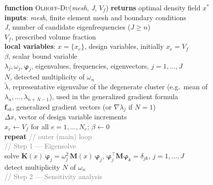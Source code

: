 \documentclass[12pt,a4paper]{article}
\newcommand{\kw}[1]{\textbf{#1}}          %
\newcommand{\fn}[1]{\textsc{#1}}          %
\newcommand{\var}[1]{\textit{#1}}         %
\newcommand{\cm}[1]{\textcolor{gray}{#1}} %
\newcommand{\ind}{\hspace*{1.4em}}        %
\newcommand{\assign}{\ensuremath{\leftarrow}}%
\begin{document}
\medskip
\begin{algobox}
\kw{function} \fn{Olhoff-Du}(\var{mesh}, \var{J}, \var{$V_f$})
\kw{returns} optimal density field $x^*$\\[2pt]
\ind\kw{inputs}: \var{mesh}, finite element mesh and boundary conditions\\
\ind\hspace*{4.2em}\var{J}, number of candidate eigenfrequencies ($J \geq n$)\\
\ind\hspace*{4.2em}$V_f$, prescribed volume fraction\\[2pt]
\ind\kw{local variables}:
  $x = \{x_e\}$, design variables, initially $x_e = V_f$\\
\ind\hspace*{9.5em}
  $\beta$, scalar bound variable\\
\ind\hspace*{9.5em}
  $\lambda_j, \omega_j, \boldsymbol{\varphi}_j$,
  eigenvalues, frequencies, eigenvectors, $j=1,\ldots,J$\\
\ind\hspace*{9.5em}
  $N$, detected multiplicity of $\omega_n$\\
\ind\hspace*{9.5em}
  $\tilde{\lambda}$, representative eigenvalue of the degenerate cluster
    (e.g.\ mean of $\lambda_n,\ldots,\lambda_{n+N-1}$), used in the
    generalized gradient formula\\
\ind\hspace*{9.5em}
  $\mathbf{f}_{sk}$, generalized gradient vectors (or
  $\nabla\!\lambda_j$ if $N=1$)\\
\ind\hspace*{9.5em}
  $\Delta\var{x}$, vector of design variable increments\\[6pt]
%
$x_e \assign V_f$ \quad for all $e = 1,\ldots,N_e$;
\quad $\beta \assign 0$\\[4pt]
%
\kw{repeat} \cm{// outer (main) loop}\\
\ind\cm{// Step 1 — Eigensolve}\\
\ind solve $\mathbf{K}(\var{x})\,\boldsymbol{\varphi}_j
           = \omega_j^2\,\mathbf{M}(\var{x})\,\boldsymbol{\varphi}_j$,
      $\boldsymbol{\varphi}_j^{\top}\mathbf{M}\boldsymbol{\varphi}_k=\delta_{jk}$,
      $j=1,\ldots,J$\\
\ind detect multiplicity $N$ of $\omega_n$\\[3pt]
%
\ind\cm{// Step 2 — Sensitivity analysis}\\

\end{algobox}
\end{document}
